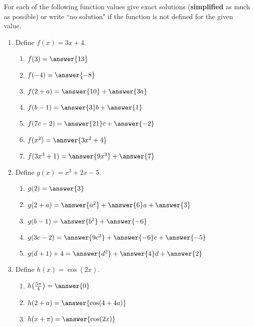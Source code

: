 \documentclass{ximera}
\author{Elizabeth Campolongo}
\begin{document}
\begin{exercise}
For each of the following function values give exact solutions ({\bf simplified} as much as possible) or write ``no solution" if the function is not defined for the given value.
%
\begin{enumerate}
%
\item Define $f(x)= 3x+4.$
\begin{enumerate}
\item $f(3) = \answer{13}$

\item $f(-4) = \answer{-8}$

\item $f(2+a)=\answer{10}+\answer{3a}$

\item $f(b-1) = \answer{3}b+\answer{1}$

\item $f(7c-2) = \answer{21}c+\answer{-2}$

\item $f(x^2) = \answer{3x^2+4}$

\item $f(3x^3+1) = \answer{9x^3} +\answer{7}$
\end{enumerate}

\item Define $g(x)= x^2+2x-5.$
\begin{enumerate}
\item $g(2) = \answer{3}$

\item $g(2+a)=\answer{a^2}+\answer{6}a+\answer{3}$

\item $g(b-1) = \answer{b^2}+ \answer{-6}$

\item $g(3c-2) = \answer{9c^2} +\answer{-6}c + \answer{-5}$

\item $g(d+1)+4 = \answer{d^2}+\answer{4}d+\answer{2}$
\end{enumerate}


\item Define $h(x)= \cos(2x).$
\begin{enumerate}
\item $h\!\left(\frac{5\pi}{4}\right) = \answer{0}$

\item $h(2+a)=\answer{\cos(4+4a)}$

\item $h(x+\pi) = \answer{\cos(2x)}$


\end{enumerate}
\end{enumerate}
\end{exercise}
\end{document}
